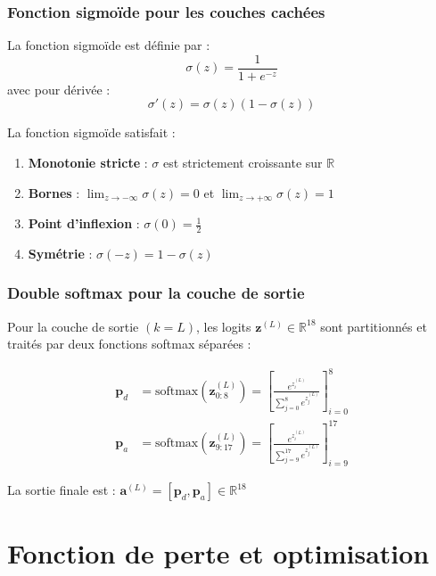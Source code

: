 \documentclass[12pt,a4paper]{report}
\numberwithin{equation}{section}
\begin{document}
\subsection{Fonction sigmoïde pour les couches cachées}

\begin{definition}
La fonction sigmoïde est définie par :
$$\sigma(z) = \frac{1}{1 + e^{-z}}$$
avec pour dérivée :
$$\sigma'(z) = \sigma(z)(1 - \sigma(z))$$
\end{definition}

\begin{theorem}
La fonction sigmoïde satisfait :
\begin{enumerate}
  \item \textbf{Monotonie stricte} : $\sigma$ est strictement croissante sur $\mathbb{R}$
  \item \textbf{Bornes} : $\lim_{z \to -\infty} \sigma(z) = 0$ et $\lim_{z \to +\infty} \sigma(z) = 1$
  \item \textbf{Point d'inflexion} : $\sigma(0) = \frac{1}{2}$
  \item \textbf{Symétrie} : $\sigma(-z) = 1 - \sigma(z)$
\end{enumerate}
\end{theorem}

\subsection{Double softmax pour la couche de sortie}

Pour la couche de sortie $(k = L)$, les logits $\mathbf{z}^{(L)} \in \mathbb{R}^{18}$ sont partitionnés et traités par deux fonctions softmax séparées :

\begin{align}
\mathbf{p}_d &= \text{softmax}(\mathbf{z}^{(L)}_{0:8}) = \left[\frac{e^{z^{(L)}_i}}{\sum_{j=0}^{8} e^{z^{(L)}_j}}\right]_{i=0}^{8}\\
\mathbf{p}_a &= \text{softmax}(\mathbf{z}^{(L)}_{9:17}) = \left[\frac{e^{z^{(L)}_i}}{\sum_{j=9}^{17} e^{z^{(L)}_j}}\right]_{i=9}^{17}
\end{align}

La sortie finale est : $\mathbf{a}^{(L)} = [\mathbf{p}_d, \mathbf{p}_a] \in \mathbb{R}^{18}$

\chapter{Fonction de perte et optimisation}
\end{document}
